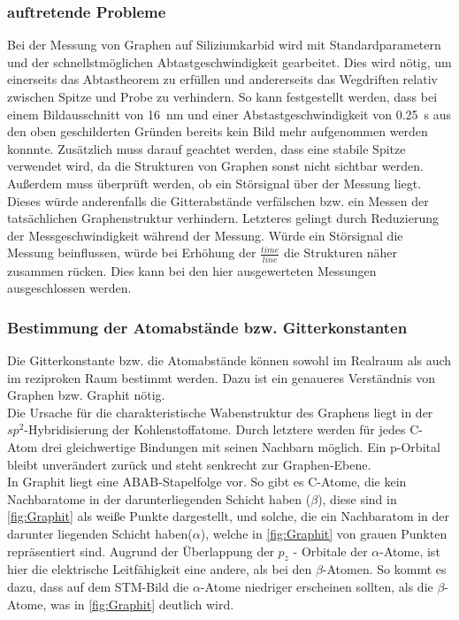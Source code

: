 \documentclass[a4paper,twoside,final]{article}
\begin{document}
\subsubsection{auftretende Probleme}
Bei der Messung von Graphen auf Siliziumkarbid wird mit Standardparametern und der schnellstmöglichen Abtastgeschwindigkeit gearbeitet. Dies wird nötig, um einerseits das Abtastheorem zu erfüllen und andererseits das Wegdriften relativ zwischen Spitze und Probe zu verhindern. So kann festgestellt werden, dass bei einem Bildausschnitt von \SI{16}{\nano\meter} und einer Abstastgeschwindigkeit von \SI{0,25}{\second} aus den oben geschilderten Gründen bereits kein Bild mehr aufgenommen werden konnnte. Zusätzlich muss darauf geachtet werden, dass eine stabile Spitze verwendet wird, da die Strukturen von Graphen sonst nicht sichtbar werden. Außerdem muss überprüft werden, ob ein Störsignal über der Messung liegt. Dieses würde anderenfalls die Gitterabstände verfälschen bzw. ein Messen der tatsächlichen Graphenstruktur verhindern. Letzteres gelingt durch Reduzierung der Messgeschwindigkeit während der Messung. Würde ein Störsignal die Messung beinflussen, würde bei Erhöhung der $\frac{time}{line}$ die Strukturen näher zusammen rücken. Dies kann bei den hier ausgewerteten Messungen ausgeschlossen werden.

\subsubsection{Bestimmung der Atomabstände bzw. Gitterkonstanten}
Die Gitterkonstante bzw. die Atomabstände können sowohl im Realraum als auch im reziproken Raum bestimmt werden. Dazu ist ein genaueres Verständnis von Graphen bzw. Graphit nötig.\\
Die Ursache für die charakteristische Wabenstruktur des Graphens liegt in der $sp^2$-Hybridisierung der Kohlenstoffatome. Durch letztere werden für jedes C-Atom drei gleichwertige Bindungen mit seinen Nachbarn möglich. Ein p-Orbital bleibt unverändert zurück und steht senkrecht zur Graphen-Ebene.\\
In Graphit liegt eine ABAB-Stapelfolge vor. So gibt es C-Atome, die kein Nachbaratome in der darunterliegenden Schicht haben ($\beta$), diese sind in \ref{fig:Graphit} als weiße Punkte dargestellt, und solche, die ein Nachbaratom in der darunter liegenden Schicht haben($\alpha$), welche in \ref{fig:Graphit} von grauen Punkten repräsentiert sind. Augrund der Überlappung der $p_z$ - Orbitale der $\alpha$-Atome, ist hier die elektrische Leitfähigkeit eine andere, als bei den $\beta$-Atomen. So kommt es dazu, dass auf dem STM-Bild die $\alpha$-Atome niedriger erscheinen sollten, als die $\beta$-Atome, was in \ref{fig:Graphit} deutlich wird.
\end{document}
